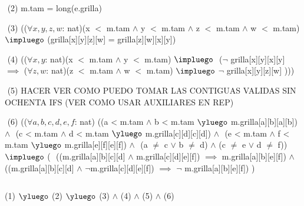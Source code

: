 \begin{Representacion}
$ $\newline
(2)
m.tam = long(e.grilla)

$ $\newline
(3) 
(($\forall x, y, z, w$: nat)(x $<$ m.tam $\land$ y $<$ m.tam $\land$ z $<$ m.tam $\land$ w $<$ m.tam) $\impluego$ (grilla[x][y][z][w] = grilla[z][w][x][y])

$ $\newline
(4)
(($\forall x, y$: nat)(x $<$ m.tam $\land$ y $<$ m.tam) $\impluego$ $ $\newline 
($\neg$ grilla[x][y][x][y] $\implies$
($\forall z, w$: nat)(z $<$ m.tam $\land$ w $<$ m.tam) $\impluego$
$\neg$ grilla[x][y][z][w] ))) 

$ $\newline
(5)
HACER
VER COMO PUEDO TOMAR LAS CONTIGUAS VALIDAS SIN OCHENTA IFS
(VER COMO USAR AUXILIARES EN REP)

$ $\newline
(6)
(($\forall a, b, c, d, e, f$: nat)$ $\newline
((a < m.tam $\land$ b < m.tam $\yluego$ m.grilla[a][b][a][b]) $\land$ $ $\newline
(c < m.tam $\land$ d < m.tam $\yluego$ m.grilla[c][d][c][d]) $\land$ $ $\newline
(e < m.tam $\land$ f < m.tam $\yluego$ m.grilla[e][f][e][f]) $\land$ $ $\newline
(a $\neq$ c $\lor$ b $\neq$ d) $\land$ (c $\neq$ e $\lor$ d $\neq$ f)) $ $\newline
$\impluego$ ( $ $\newline
((m.grilla[a][b][c][d] $\land$ m.grilla[c][d][e][f]) $\implies$ m.grilla[a][b][e][f]) $\land $\newline
((m.grilla[a][b][c][d] $\land$ $\neg$m.grilla[c][d][e][f]) $\implies$ $\neg$ m.grilla[a][b][e][f])$ $\newline
)

$ $\newline

%
{{(1) $\yluego$ (2) $\yluego$ (3) $\land$ (4) $\land$ (5) $\land$ (6)}} 

$ $\newline
$ $\newline

\AbsFc[]{}

\end{Representacion}

